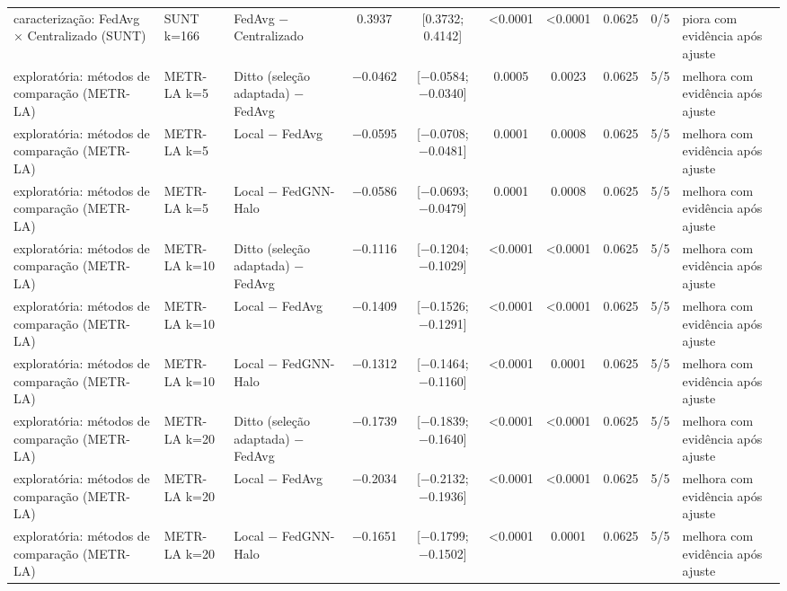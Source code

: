 \begin{tabular}{lllccccccl}
caracterização: FedAvg × Centralizado (SUNT) & SUNT k=166 & FedAvg − Centralizado & \num{+0.3937} & [\num{+0.3732}; \num{+0.4142}] & \num{<0.0001} & \num{<0.0001} & \num{0.0625} & 0/5 & piora com evidência após ajuste \\
exploratória: métodos de comparação (METR-LA) & METR-LA k=5 & Ditto (seleção adaptada) − FedAvg & \num{-0.0462} & [\num{-0.0584}; \num{-0.0340}] & \num{0.0005} & \num{0.0023} & \num{0.0625} & 5/5 & melhora com evidência após ajuste \\
exploratória: métodos de comparação (METR-LA) & METR-LA k=5 & Local − FedAvg & \num{-0.0595} & [\num{-0.0708}; \num{-0.0481}] & \num{0.0001} & \num{0.0008} & \num{0.0625} & 5/5 & melhora com evidência após ajuste \\
exploratória: métodos de comparação (METR-LA) & METR-LA k=5 & Local − FedGNN-Halo & \num{-0.0586} & [\num{-0.0693}; \num{-0.0479}] & \num{0.0001} & \num{0.0008} & \num{0.0625} & 5/5 & melhora com evidência após ajuste \\
exploratória: métodos de comparação (METR-LA) & METR-LA k=10 & Ditto (seleção adaptada) − FedAvg & \num{-0.1116} & [\num{-0.1204}; \num{-0.1029}] & \num{<0.0001} & \num{<0.0001} & \num{0.0625} & 5/5 & melhora com evidência após ajuste \\
exploratória: métodos de comparação (METR-LA) & METR-LA k=10 & Local − FedAvg & \num{-0.1409} & [\num{-0.1526}; \num{-0.1291}] & \num{<0.0001} & \num{<0.0001} & \num{0.0625} & 5/5 & melhora com evidência após ajuste \\
exploratória: métodos de comparação (METR-LA) & METR-LA k=10 & Local − FedGNN-Halo & \num{-0.1312} & [\num{-0.1464}; \num{-0.1160}] & \num{<0.0001} & \num{0.0001} & \num{0.0625} & 5/5 & melhora com evidência após ajuste \\
exploratória: métodos de comparação (METR-LA) & METR-LA k=20 & Ditto (seleção adaptada) − FedAvg & \num{-0.1739} & [\num{-0.1839}; \num{-0.1640}] & \num{<0.0001} & \num{<0.0001} & \num{0.0625} & 5/5 & melhora com evidência após ajuste \\
exploratória: métodos de comparação (METR-LA) & METR-LA k=20 & Local − FedAvg & \num{-0.2034} & [\num{-0.2132}; \num{-0.1936}] & \num{<0.0001} & \num{<0.0001} & \num{0.0625} & 5/5 & melhora com evidência após ajuste \\
exploratória: métodos de comparação (METR-LA) & METR-LA k=20 & Local − FedGNN-Halo & \num{-0.1651} & [\num{-0.1799}; \num{-0.1502}] & \num{<0.0001} & \num{0.0001} & \num{0.0625} & 5/5 & melhora com evidência após ajuste \\

\end{tabular}
